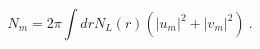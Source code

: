 \begin{equation}
N_m = 2 \pi \int dr N_L(r)\left(|u_m|^2+|v_m|^2\right)~.
\label{nm}
\end{equation}

